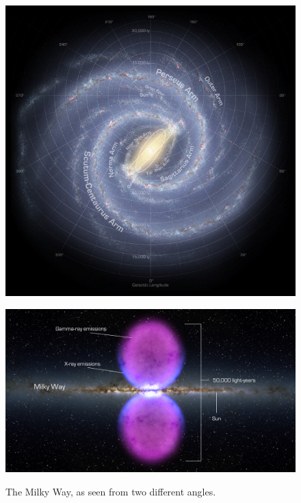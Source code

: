 \begin{figure}[h]
  \centering
  \begin{minipage}[h]{0.45\textwidth}
  	\centering
	\includegraphics[width=1.\linewidth]{pic/theory/top_galaxy_map.jpg}
  	\label{fig:top_gal_map}
  \end{minipage}
  \hfill
  \begin{minipage}[h]{0.45\textwidth}
	  \centering
	  \includegraphics[width=1.\linewidth]{pic/theory/Fermi_bubble.jpg}
	  \label{fig:fermi_bubbles}
  \end{minipage}
  \caption{The Milky Way, as seen from two different angles.}
  \label{fig:Galaxy_maps} 
\end{figure}

